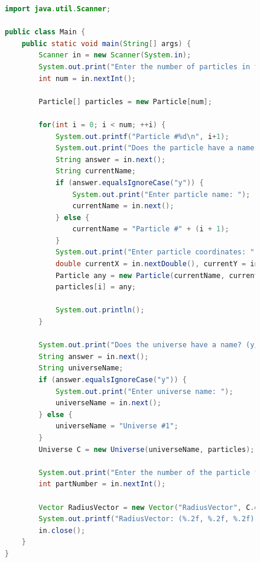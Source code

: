 \documentclass[a4paper, 14pt]{extarticle}
\begin{document}
\begin{figure}[!htb]
\begin{lstlisting}[language=Java,caption={Класс Main},label={lst:main}]
import java.util.Scanner;

public class Main {
    public static void main(String[] args) {
        Scanner in = new Scanner(System.in);
        System.out.print("Enter the number of particles in the universe: ");
        int num = in.nextInt();

        Particle[] particles = new Particle[num];

        for(int i = 0; i < num; ++i) {
            System.out.printf("Particle #%d\n", i+1);
            System.out.print("Does the particle have a name? (y/n): ");
            String answer = in.next();
            String currentName;
            if (answer.equalsIgnoreCase("y")) {
                System.out.print("Enter particle name: ");
                currentName = in.next();
            } else {
                currentName = "Particle #" + (i + 1);
            }
            System.out.print("Enter particle coordinates: ");
            double currentX = in.nextDouble(), currentY = in.nextDouble(), currentZ = in.nextDouble();
            Particle any = new Particle(currentName, currentX, currentY, currentZ);
            particles[i] = any;

            System.out.println();
        }

        System.out.print("Does the universe have a name? (y/n): ");
        String answer = in.next();
        String universeName;
        if (answer.equalsIgnoreCase("y")) {
            System.out.print("Enter universe name: ");
            universeName = in.next();
        } else {
            universeName = "Universe #1";
        }
        Universe C = new Universe(universeName, particles);

        System.out.print("Enter the number of the particle to which you want to calculate the radius vector: ");
        int partNumber = in.nextInt();

        Vector RadiusVector = new Vector("RadiusVector", C.getCenter(), particles[partNumber-1]);
        System.out.printf("RadiusVector: (%.2f, %.2f, %.2f)", RadiusVector.getX(), RadiusVector.getY(), RadiusVector.getZ());
        in.close();
    }
}

\end{lstlisting}
\end{figure}

\newpage
\end{document}
